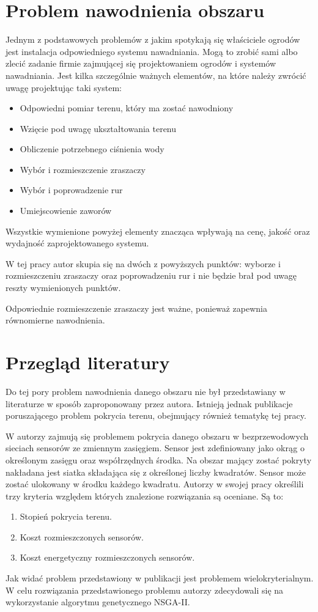 \documentclass[twoside]{iisthesis}
\begin{document}
\section{Problem nawodnienia obszaru}
Jednym z podstawowych problemów z jakim spotykają się właściciele ogrodów jest instalacja odpowiedniego systemu nawadniania. Mogą to zrobić sami albo zlecić zadanie firmie zajmującej się projektowaniem ogrodów i systemów nawadniania.
Jest kilka szczególnie ważnych elementów, na które należy zwrócić uwagę projektując taki system:\\
\begin{itemize}
	\item Odpowiedni pomiar terenu, który ma zostać nawodniony
	\item Wzięcie pod uwagę ukształtowania terenu
	\item Obliczenie potrzebnego ciśnienia wody
	\item Wybór i rozmieszczenie zraszaczy
	\item Wybór i poprowadzenie rur
	\item Umiejscowienie zaworów\\
\end{itemize}
Wszystkie wymienione powyżej elementy znacząca wpływają na cenę, jakość oraz wydajność zaprojektowanego systemu.

W tej pracy autor skupia się na dwóch z powyższych punktów: wyborze i rozmieszczeniu zraszaczy oraz poprowadzeniu rur i nie będzie brał pod uwagę reszty wymienionych punktów.

Odpowiednie rozmieszczenie zraszaczy jest ważne, ponieważ zapewnia równomierne nawodnienia.

\section{Przegląd literatury}
Do tej pory problem nawodnienia danego obszaru nie był przedstawiany w literaturze w sposób zaproponowany przez autora. Istnieją jednak publikacje poruszającego problem pokrycia terenu, obejmujący również tematykę tej pracy.

W \cite{sensors} autorzy zajmują się problemem pokrycia danego obszaru w bezprzewodowych sieciach sensorów ze zmiennym zasięgiem. Sensor jest zdefiniowany jako okrąg o określonym zasięgu oraz współrzędnych środka. Na obszar mający zostać pokryty nakładana jest siatka składająca się z określonej liczby kwadratów. Sensor może zostać ulokowany w środku każdego kwadratu. Autorzy w swojej pracy określili trzy kryteria względem których znalezione rozwiązania są oceniane. Są to:\\
\begin{enumerate}
	\item Stopień pokrycia terenu.
	\item Koszt rozmieszczonych sensorów.
	\item Koszt energetyczny rozmieszczonych sensorów.\\
\end{enumerate}
Jak widać problem przedstawiony w publikacji jest problemem wielokryterialnym. W celu rozwiązania przedstawionego problemu autorzy zdecydowali się na wykorzystanie algorytmu genetycznego NSGA-II.
\end{document}
